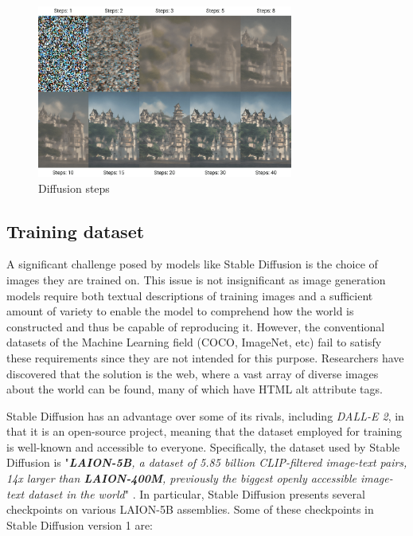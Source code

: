 \begin{figure}
    \centering
    \includegraphics[width=0.75\textwidth]{Pictures/DProcess.png} 
    \caption{Diffusion steps \cite{wikiStableDiffusion}}
    \label{fig:DProcess}
\end{figure}

\subsection{Training dataset}

A significant challenge posed by models like Stable Diffusion is the choice of images they are trained on. This issue is not insignificant as image generation models require both textual descriptions of training images and a sufficient amount of variety to enable the model to comprehend how the world is constructed and thus be capable of reproducing it. However, the conventional datasets of the Machine Learning field (COCO, ImageNet, etc) fail to satisfy these requirements since they are not intended for this purpose. Researchers have discovered that the solution is the web, where a vast array of diverse images about the world can be found, many of which have HTML alt attribute tags.

Stable Diffusion has an advantage over some of its rivals, including \textit{DALL-E 2}, in that it is an open-source project, meaning that the dataset employed for training is well-known and accessible to everyone. Specifically, the dataset used by Stable Diffusion is "\textit{\textbf{LAION-5B}, a dataset of 5.85 billion CLIP-filtered image-text pairs, 14x larger than \textbf{LAION-400M}, previously the biggest openly accessible image-text dataset in the world}" \cite{schuhmann2022laion}. In particular, Stable Diffusion presents several checkpoints on various LAION-5B assemblies. Some of these checkpoints in Stable Diffusion version 1 \cite{SDCardHF} are:

